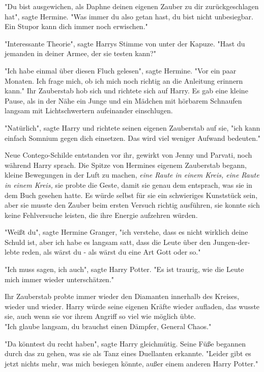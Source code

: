 {"Du bist ausgewichen, als Daphne deinen eigenen Zauber zu dir zurückgeschlagen hat", sagte Hermine. "Was immer du also getan hast, du bist nicht unbesiegbar. Ein Stupor kann dich immer noch erwischen."

"Interessante Theorie", sagte Harrys Stimme von unter der Kapuze. "Hast du jemanden in deiner Armee, der sie testen kann?"

"Ich habe einmal über diesen Fluch gelesen", sagte Hermine. "Vor ein paar Monaten. Ich frage mich, ob ich mich noch richtig an die Anleitung erinnern kann." Ihr Zauberstab hob sich und richtete sich auf Harry. Es gab eine kleine Pause, als in der Nähe ein Junge und ein Mädchen mit hörbarem Schnaufen langsam mit Lichtschwertern aufeinander einschlugen.

"Natürlich", sagte Harry und richtete seinen eigenen Zauberstab auf sie, "ich kann einfach Somnium gegen dich einsetzen. Das wird viel weniger Aufwand bedeuten."

Neue Contego-Schilde entstanden vor ihr, gewirkt von Jenny und Parvati, noch während Harry sprach. Die Spitze von Hermines eigenem Zauberstab begann, kleine Bewegungen in der Luft zu machen, \emph{eine Raute in einem Kreis, eine Raute in einem Kreis,} sie probte die Geste, damit sie genau dem entsprach, was sie in dem Buch gesehen hatte. Es würde selbst für sie ein schwieriges Kunststück sein, aber sie musste den Zauber beim ersten Versuch richtig ausführen, sie konnte sich keine Fehlversuche leisten, die ihre Energie aufzehren würden.

"Weißt du", sagte Hermine Granger, "ich verstehe, dass es nicht wirklich deine Schuld ist, aber ich habe es langsam satt, dass die Leute über den Jungen-der-lebte reden, als wärst du - als wärst du eine Art Gott oder so."

"Ich muss sagen, ich auch", sagte Harry Potter. "Es ist traurig, wie die Leute mich immer wieder unterschätzen."

Ihr Zauberstab probte immer wieder den Diamanten innerhalb des Kreises, wieder und wieder. Harry würde seine eigenen Kräfte wieder aufladen, das wusste sie, auch wenn sie vor ihrem Angriff so viel wie möglich übte.\\ "Ich glaube langsam, du brauchst einen Dämpfer, General Chaos."

"Da könntest du recht haben", sagte Harry gleichmütig. Seine Füße begannen durch das zu gehen, was sie als Tanz eines Duellanten erkannte. "Leider gibt es jetzt nichts mehr, was mich besiegen könnte, außer einem anderen Harry Potter."

}
